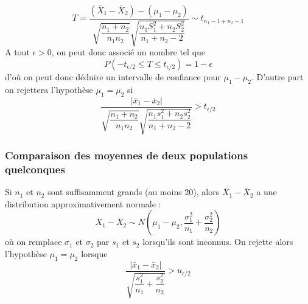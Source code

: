 $$\boxed{T = \dfrac{(\bar{X}_1 - \bar{X}_2) - (\mu_1 - \mu_2)}{\sqrt{\dfrac{n_1+n_2}{n_1n_2}}\sqrt{\dfrac{n_1S^2_1+n_2S_2^2}{n_1+n_2-2}}} \sim t_{n_1-1+n_2-1}}$$
A tout $\epsilon > 0$, on peut donc associé un nombre tel que $$P\left(-t_{\epsilon/2} \leq T \leq t_{\epsilon/2} \right) = 1 - \epsilon$$ d'où on peut donc déduire un intervalle de confiance pour $\mu_1 - \mu_2$. D'autre part on rejettera l'hypothèse $\mu_1 = \mu_2$ si $$\dfrac{|\bar{x}_1 - \bar{x}_2|}{\sqrt{\dfrac{n_1+n_2}{n_1n_2}}\sqrt{\dfrac{n_1s^2_1+n_2s_2^2}{n_1+n_2-2}}} > t_{\epsilon/2}$$










\newpage
\subsubsection{Comparaison des moyennes de deux populations quelconques}
Si $n_1$ et $n_2$ sont suffisamment grands (au moins 20), alors $\bar{X}_1 - \bar{X}_2$ a une distribution
approximativement normale :$$\boxed{\bar{X}_1 - \bar{X}_2 \sim N\left(\mu_1 - \mu_2, \dfrac{\sigma_1^2}{n_1} + \dfrac{\sigma_2^2}{n_2}\right)}$$
où on remplace $\sigma_1$ et $\sigma_2$ par $s_1$ et $s_2$ lorsqu'ils sont inconnus. On rejette alors l'hypothèse $\mu_1 = \mu_2$ lorsque $$\dfrac{\left|\bar{x}_1 - \bar{x}_2\right|}{\sqrt{\dfrac{s_1^2}{n_1} + \dfrac{s_2^2}{n_2}}} > u_{\epsilon/2}$$